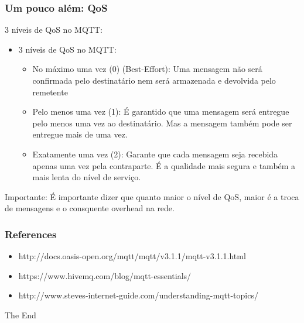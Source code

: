 \documentclass{beamer}
\begin{document}
\begin{frame}
\frametitle{Um pouco além: QoS}

3 níveis de QoS no MQTT:
\begin{itemize}
\item 3 níveis de QoS no MQTT:

\begin{itemize}
\item No máximo uma vez (0) (Best-Effort): Uma mensagem não será confirmada pelo destinatário nem será armazenada e devolvida pelo remetente
\item Pelo menos uma vez (1): É garantido que uma mensagem será entregue pelo menos uma vez ao destinatário. Mas a mensagem também pode ser entregue mais de uma vez.

\item Exatamente uma vez (2): Garante que cada mensagem seja recebida apenas uma vez pela contraparte. É a qualidade mais segura e também a mais lenta do nível de serviço.
\end{itemize}
\end{itemize}

\begin{block}{Importante:}
É importante dizer que quanto maior o nível de QoS, maior é a troca de mensagens e o consquente overhead na rede.
\end{block}
\end{frame}







\begin{frame}
\frametitle{References}
\begin{itemize}
\item http://docs.oasis-open.org/mqtt/mqtt/v3.1.1/mqtt-v3.1.1.html
\item https://www.hivemq.com/blog/mqtt-essentials/
\item http://www.steves-internet-guide.com/understanding-mqtt-topics/
\end{itemize}
\end{frame}


\begin{frame}
\Huge{\centerline{The End}}
\end{frame}

\end{document}
